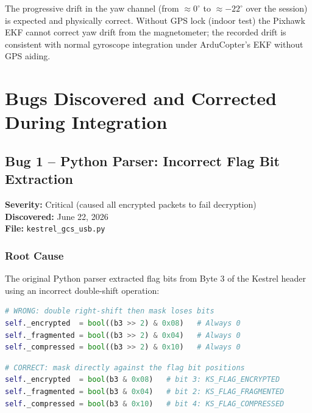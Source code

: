 \documentclass[11pt,a4paper]{article}
\begin{document}
\begin{notebox}
    The progressive drift in the yaw channel (from $\approx 0^{\circ}$ to
    $\approx -22^{\circ}$ over the session) is expected and physically correct.
    Without GPS lock (indoor test) the Pixhawk EKF cannot correct yaw drift
    from the magnetometer; the recorded drift is consistent with normal gyroscope
    integration under ArduCopter's EKF without GPS aiding.
\end{notebox}

\newpage

\section{Bugs Discovered and Corrected During Integration}
\label{sec:bugs}

\subsection{Bug 1 -- Python Parser: Incorrect Flag Bit Extraction}

\textbf{Severity:} Critical (caused all encrypted packets to fail decryption) \\
\textbf{Discovered:} June 22, 2026 \\
\textbf{File:} \texttt{kestrel\_gcs\_usb.py}

\subsubsection{Root Cause}

The original Python parser extracted flag bits from Byte 3 of the Kestrel
header using an incorrect double-shift operation:

\begin{lstlisting}[language=Python, style=pystyle,
    caption={Incorrect flag extraction (before fix)}]
# WRONG: double right-shift then mask loses bits
self._encrypted  = bool((b3 >> 2) & 0x08)   # Always 0
self._fragmented = bool((b3 >> 2) & 0x04)   # Always 0
self._compressed = bool((b3 >> 2) & 0x10)   # Always 0
\end{lstlisting}

\begin{lstlisting}[language=Python, style=pystyle,
    caption={Correct flag extraction (after fix)}]
# CORRECT: mask directly against the flag bit positions
self._encrypted  = bool(b3 & 0x08)   # bit 3: KS_FLAG_ENCRYPTED
self._fragmented = bool(b3 & 0x04)   # bit 2: KS_FLAG_FRAGMENTED
self._compressed = bool(b3 & 0x10)   # bit 4: KS_FLAG_COMPRESSED
\end{lstlisting}
\end{document}
